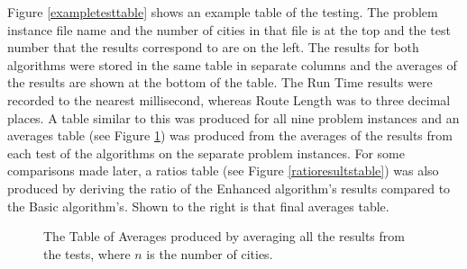 \documentclass[conference,backref=page]{acmsiggraph}
\begin{document}
Figure \ref{exampletesttable} shows an example table of the testing. The problem instance file name and the number of cities in that file is at the top and the test number that the results correspond to are on the left. The results for both algorithms were stored in the same table in separate columns and the averages of the results are shown at the bottom of the table. The Run Time results were recorded to the nearest millisecond, whereas Route Length was to three decimal places. A table similar to this was produced for all nine problem instances and an averages table (see Figure \ref{avgresultstable}) was produced from the averages of the results from each test of the algorithms on the separate problem instances. For some comparisons made later, a ratios table (see Figure \ref{ratioresultstable}) was also produced by deriving the ratio of the Enhanced algorithm's results compared to the Basic algorithm's. Shown to the right is that final averages table.

\begin{figure}[h]
	\begin{center}
		\caption{The Table of Averages produced by averaging all the results from the tests, where $n$ is the number of cities.}
		\label{avgresultstable}
	\end{center}
\end{figure}
\end{document}
